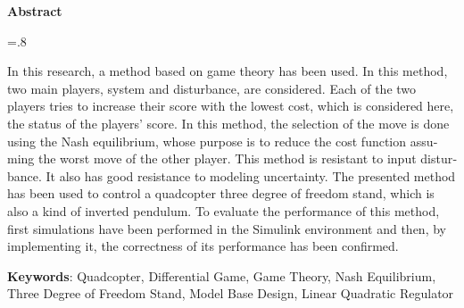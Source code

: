 


\pagestyle{empty}

\begin{latin}
	
	\begin{center}
		\textbf{Abstract}
	\end{center}
	\baselineskip=.8\baselineskip
	
	In this research, a method based on game theory has been used. In this method, two main players, system and disturbance, are considered. Each of the two players tries to increase their score with the lowest cost, which is considered here, the status of the players' score. In this method, the selection of the move is done using the Nash equilibrium, whose purpose is to reduce the cost function assuming the worst move of the other player. This method is resistant to input disturbance. It also has good resistance to modeling uncertainty. The presented method has been used to control a quadcopter three degree of freedom stand, which is also a kind of inverted pendulum. To evaluate the performance of this method, first simulations have been performed in the Simulink environment and then, by implementing it, the correctness of its performance has been confirmed.
	
	\bigskip\noindent\textbf{Keywords}:
	Quadcopter, Differential Game, Game Theory, Nash Equilibrium, Three Degree of Freedom Stand, Model Base Design, Linear Quadratic Regulator
	
\end{latin}

\newpage